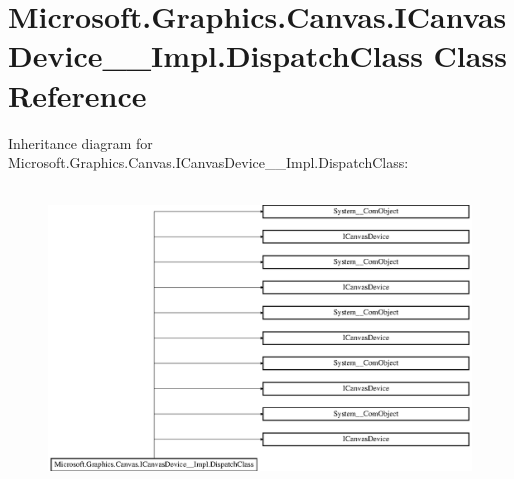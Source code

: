 \hypertarget{class_microsoft_1_1_graphics_1_1_canvas_1_1_i_canvas_device_____impl_1_1_dispatch_class}{}\section{Microsoft.\+Graphics.\+Canvas.\+I\+Canvas\+Device\+\_\+\+\_\+\+Impl.\+Dispatch\+Class Class Reference}
\label{class_microsoft_1_1_graphics_1_1_canvas_1_1_i_canvas_device_____impl_1_1_dispatch_class}
Inheritance diagram for Microsoft.\+Graphics.\+Canvas.\+I\+Canvas\+Device\+\_\+\+\_\+\+Impl.\+Dispatch\+Class\+:\begin{figure}[H]
\begin{center}
\leavevmode
\includegraphics[height=8.000000cm]{class_microsoft_1_1_graphics_1_1_canvas_1_1_i_canvas_device_____impl_1_1_dispatch_class}
\end{center}
\end{figure}
